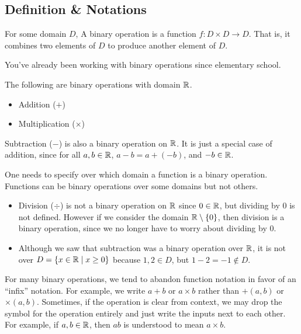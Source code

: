 \subsection{Definition \& Notations}
\begin{definition}
	For some domain $D$, A binary operation is a function $f: D \times D \to D$.
	That is, it combines two elements of $D$ to produce another element of $D$.
\end{definition}

You've already been working with binary operations since elementary school.
\begin{example}
	The following are binary operations with domain $\mathbb{R}$.
	\begin{itemize}
		\item Addition ($+$)
		\item Multiplication ($\times$)
	\end{itemize}
	Subtraction ($-$) is also a binary operation on $\mathbb{R}$.
	It is just a special case of addition, since for all $a,b \in \mathbb{R}$, $a - b = a + (-b)$, and $-b \in \mathbb{R}$.
\end{example}

One needs to specify over which domain a function is a binary operation.
Functions can be binary operations over some domains but not others.
\begin{example}
	\hspace{1pt}
	\begin{itemize}
		\item
		Division ($\div$) is not a binary operation on $\mathbb{R}$ since $0 \in \mathbb{R}$, but dividing by 0 is not defined.
		However if we consider the domain $\mathbb{R} \setminus \{0\}$, then division is a binary operation, since we no longer have to worry about dividing by 0.
		\item
		Although we saw that subtraction was a binary operation over $\mathbb{R}$, it is not over $D = \{x \in \mathbb{R} \mid x \geq 0\}$ because $1,2 \in D$, but $1 - 2 = -1 \not\in D$.
	\end{itemize}
\end{example}

For many binary operations, we tend to abandon function notation in favor of an ``infix'' notation.
For example, we write $a + b$ or $a \times b$ rather than $+(a,b)$ or $\times(a,b)$.
Sometimes, if the operation is clear from context, we may drop the symbol for the operation entirely and just write the inputs next to each other.
For example, if $a,b \in \mathbb{R}$, then $ab$ is understood to mean $a \times b$.